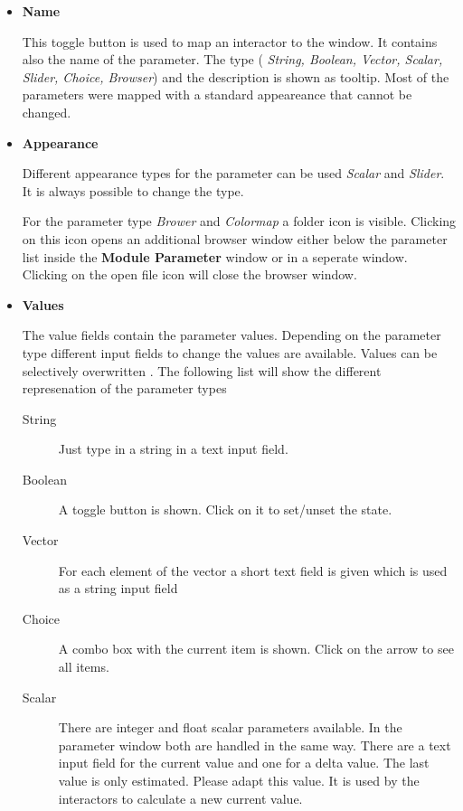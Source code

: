 	 \begin{itemize}
	 \item {\bf Name} 

	 This toggle button is used to map an interactor to 
	 the {\mycontrol} window. It contains also the name of the parameter. The type (
    {\it String, Boolean, Vector, Scalar, Slider, Choice, Browser}) and the description is shown as tooltip. 
    Most of the parameters were mapped with a standard appeareance that cannot be changed.

	 \item {\bf Appearance} 

	 Different appearance types for the parameter can be used {\it Scalar} and {\it Slider}. It is always
    possible to change the type.
     
    For the parameter type {\it Brower} and {\it Colormap} a folder icon is visible. Clicking on this icon 
    opens an additional browser window either below the parameter list inside the {\bf Module Parameter} window 
    or in a seperate window. Clicking on the open file icon will close the browser window.

	 \item{\bf Values} 

	 The value fields contain the parameter values. Depending on the parameter type different 
	 input fields to change the values are available. Values can be selectively overwritten . 
    The following list will show the different represenation of the parameter types

	 \begin{description}
	 \item[String] 
	 Just type in a string in a text input field.

	 \item[Boolean]
	 A toggle button is shown. Click on it to set/unset the state.
    
	 \item[Vector]
	 For each element of the vector a short text field is given which is used
	 as a string input field    

	 \item[Choice]
	 A combo box with the current item is shown. Click on the arrow to see all items.

	 \item[Scalar]
	 There are integer and float scalar parameters available. In the parameter window both are handled 
    in the same way. There are a text input field for the current value and one for a delta value. 
    The last value is only estimated. Please adapt this value. It is used by the interactors 
    to calculate a new current value.


\end{description}
\end{itemize}
